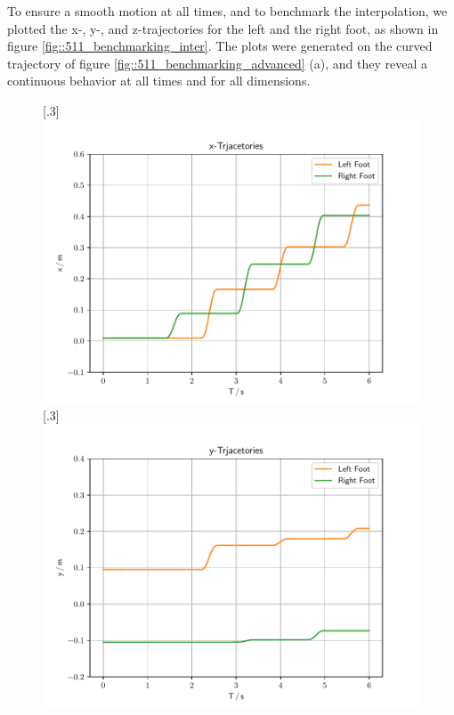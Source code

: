 To ensure a smooth motion at all times, and to benchmark the interpolation, we plotted the x-, y-, and z-trajectories for the left and the right foot, as shown in figure \ref{fig::511_benchmarking_inter}. The plots were generated on the curved trajectory of figure \ref{fig::511_benchmarking_advanced} (a), and they reveal a continuous behavior at all times and for all dimensions.
\begin{figure}[h]
	\centering
	[.3\linewidth]{\includegraphics[scale=.3]{chapters/05_experiments/01_user_controlled_walking/01_benchmarking/interpolated_x_trajectories.pdf}}
	[.3\linewidth]{\includegraphics[scale=.3]{chapters/05_experiments/01_user_controlled_walking/01_benchmarking/interpolated_y_trajectories.pdf}}

\end{figure}

